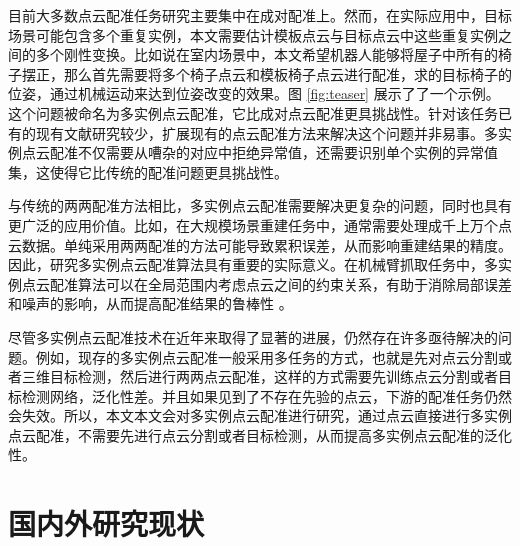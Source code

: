 目前大多数点云配准任务研究主要集中在成对配准上。然而，在实际应用中，目标场景可能包含多个重复实例，本文需要估计模板点云与目标点云中这些重复实例之间的多个刚性变换。比如说在室内场景中，本文希望机器人能够将屋子中所有的椅子摆正，那么首先需要将多个椅子点云和模板椅子点云进行配准，求的目标椅子的位姿，通过机械运动来达到位姿改变的效果。图 \ref{fig:teaser} 展示了了一个示例。这个问题被命名为多实例点云配准，它比成对点云配准更具挑战性。针对该任务已有的现有文献研究较少，扩展现有的点云配准方法来解决这个问题并非易事。多实例点云配准不仅需要从嘈杂的对应中拒绝异常值，还需要识别单个实例的异常值集，这使得它比传统的配准问题更具挑战性。

与传统的两两配准方法相比，多实例点云配准需要解决更复杂的问题，同时也具有更广泛的应用价值。比如，在大规模场景重建任务中，通常需要处理成千上万个点云数据。单纯采用两两配准的方法可能导致累积误差，从而影响重建结果的精度。因此，研究多实例点云配准算法具有重要的实际意义。在机械臂抓取任务中，多实例点云配准算法可以在全局范围内考虑点云之间的约束关系，有助于消除局部误差和噪声的影响，从而提高配准结果的鲁棒性 \cite{stuckler2012robust} 。

尽管多实例点云配准技术在近年来取得了显著的进展，仍然存在许多亟待解决的问题。例如，现存的多实例点云配准一般采用多任务的方式，也就是先对点云分割或者三维目标检测，然后进行两两点云配准，这样的方式需要先训练点云分割或者目标检测网络，泛化性差。并且如果见到了不存在先验的点云，下游的配准任务仍然会失效。所以，本文本文会对多实例点云配准进行研究，通过点云直接进行多实例点云配准，不需要先进行点云分割或者目标检测，从而提高多实例点云配准的泛化性。


\section{国内外研究现状}

